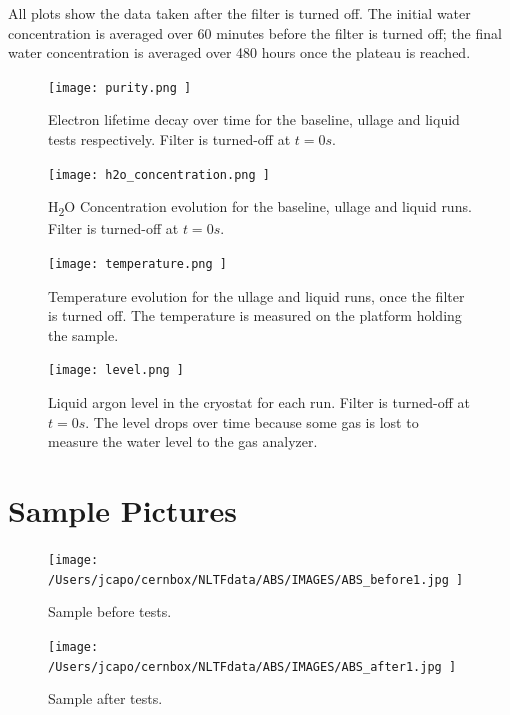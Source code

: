 \documentclass[12pt]{article}
\begin{document}
All plots show the data taken after the filter is turned off. The initial water concentration is averaged over 60 minutes before the filter is turned off; the final water concentration is averaged over 480 hours once the plateau is reached.

\begin{figure}[H]
    \centering
    \texttt{[image:  purity.png ]}
    \centering
    \caption{Electron lifetime decay over time for the baseline, ullage and liquid tests respectively. Filter is turned-off at $t=0 s$.}
    \label{fig:purity}
\end{figure}

\begin{figure}[H]
    \centering
    \texttt{[image:  h2o\_concentration.png ]}
    \centering
    \caption{H\textsubscript{2}O Concentration evolution for the baseline, ullage and liquid runs. Filter is turned-off at $t=0 s$.}
    \label{fig:h2o}
\end{figure}

\begin{figure}[H]
    \centering
    \texttt{[image:  temperature.png ]}
    \centering
    \caption{Temperature evolution for the ullage and liquid runs, once the filter is turned off. The temperature is measured on the platform holding the sample.}
    \label{fig:temperature}
\end{figure}

\begin{figure}[H]
    \centering
    \texttt{[image:  level.png ]}
    \centering
    \caption{Liquid argon level in the cryostat for each run. Filter is turned-off at $t=0 s$. The level drops over time because some gas is lost to measure the water level to the gas analyzer.}
    \label{fig:level}
\end{figure}

\section*{Sample Pictures}
\label{sec:pictures}

\begin{figure}[H]
    \centering
    \begin{minipage}{\textwidth}
        \centering
        \texttt{[image:  /Users/jcapo/cernbox/NLTFdata/ABS/IMAGES/ABS\_before1.jpg ]}
        \centering
        \caption{Sample before tests.}
        \label{fig:sample_before}
    \end{minipage}

    \vspace{0.02\textheight}

    \begin{minipage}{\textwidth}
        \centering
        \texttt{[image:  /Users/jcapo/cernbox/NLTFdata/ABS/IMAGES/ABS\_after1.jpg ]}
        \centering
        \caption{Sample after tests.}
        \label{fig:sample_after}
    \end{minipage}
\end{figure}
\end{document}
